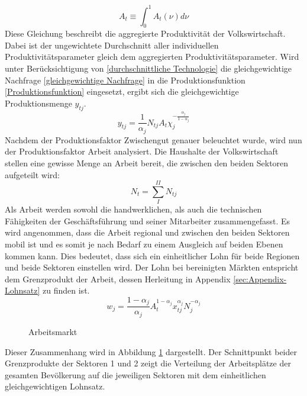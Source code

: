 %
	\begin{equation}
		A_{t}\equiv\int_0^1A_{t}(\nu)d\nu\label{durchschnittliche Technologie}
	\end{equation}
%
Diese Gleichung beschreibt die aggregierte Produktivität der Volkswirtschaft. Dabei ist der ungewichtete Durchschnitt aller individuellen Produktivitätsparameter gleich dem aggregierten Produktivitätsparameter. Wird unter Berücksichtigung von \eqref{durchschnittliche Technologie} die gleichgewichtige Nachfrage \eqref{gleichgewichtige Nachfrage} in die Produktionsfunktion \eqref{Produktionsfunktion} eingesetzt, ergibt sich die gleichgewichtige Produktionsmenge $y_{tj}$. 
%
	\begin{equation}
		y_{tj}=\frac{1}{\alpha_j}N_{tj}A_t\chi_j^{-\frac{\alpha_j}{1-\alpha_j}}
	\end{equation}
%
\bigskip
Nachdem der Produktionsfaktor Zwischengut genauer beleuchtet wurde, wird nun der Produktionsfaktor Arbeit analysiert. Die Haushalte der Volkswirtschaft stellen eine gewisse Menge an Arbeit bereit, die zwischen den beiden Sektoren aufgeteilt wird: 
%
	\begin{equation}
		N_t=\sum_I^{II}{N_{tj}}
	\end{equation}
%
Als Arbeit werden sowohl die handwerklichen, als auch die technischen Fähigkeiten der Geschäftsführung und seiner Mitarbeiter zusammengefasst. Es wird angenommen, dass die Arbeit regional und zwischen den beiden Sektoren mobil ist und es somit je nach Bedarf zu einem Ausgleich auf beiden Ebenen kommen kann. Dies bedeutet, dass sich ein einheitlicher Lohn für beide Regionen und beide Sektoren einstellen wird. Der Lohn bei bereinigten Märkten entspricht dem Grenzprodukt der Arbeit, dessen Herleitung in Appendix \ref{sec:Appendix-Lohnsatz} zu finden ist.  
%
	\begin{equation}
		w_j=\frac{1-\alpha_j}{\alpha_j}A_t^{1-\alpha_j}x_{tj}^{\alpha_j}N_j^{-\alpha_j}
	\end{equation}
%
	\begin{figure}[htbp]
		\caption{Arbeitsmarkt}
		\hfill {}
		\label{Grenzentlohnung}
		\vspace{0.48cm}
	\end{figure}
%
Dieser Zusammenhang wird in Abbildung \ref{Grenzentlohnung} dargestellt. Der Schnittpunkt beider Grenzprodukte der Sektoren 1 und 2 zeigt die Verteilung der Arbeitsplätze der gesamten Bevölkerung auf die jeweiligen Sektoren mit dem einheitlichen gleichgewichtigen Lohnsatz. 
%
